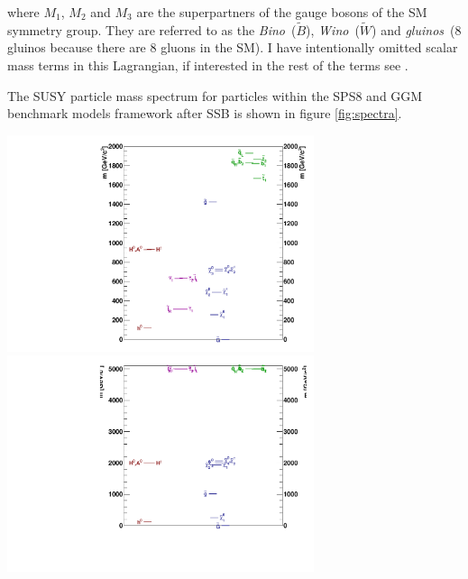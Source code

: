 where $M_{1}$, $M_{2}$ and $M_{3}$ are the superpartners of the gauge bosons of the SM symmetry group. They are referred to as the \textit{Bino}~($\tilde{B}$), \textit{Wino}~($\tilde{W}$) and \textit{gluinos}~(8 gluinos because there are 8 gluons in the SM). I have intentionally omitted  scalar mass terms in this Lagrangian, if interested in the rest of the terms see \cite{SM}.

The SUSY particle mass spectrum for particles within the SPS8 and GGM benchmark models framework after SSB is shown in figure \ref{fig:spectra}.
\begin{center}
\centering
\mbox{\includegraphics[height=2.5in]{THESISPLOTS/gmsb_Lambda180_CTau10000.pdf} \quad 
\includegraphics[height=2.5in]{THESISPLOTS/M3_1015_M1_255.pdf} }
\label{fig:spectra}
\end{center}

